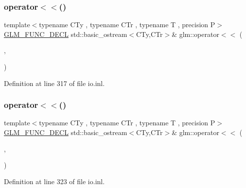 \subsubsection{\texorpdfstring{operator$<$$<$()}{operator<<()}\hspace{0.1cm}{\footnotesize\ttfamily [6/15]}}
{\footnotesize\ttfamily template$<$typename C\+Ty , typename C\+Tr , typename T , precision P$>$ \\
\mbox{\hyperlink{setup_8hpp_ab2d052de21a70539923e9bcbf6e83a51}{G\+L\+M\+\_\+\+F\+U\+N\+C\+\_\+\+D\+E\+CL}} std\+::basic\+\_\+ostream$<$C\+Ty,C\+Tr$>$\& glm\+::operator$<$$<$ (\begin{DoxyParamCaption}\item[{std\+::basic\+\_\+ostream$<$ C\+Ty, C\+Tr $>$ \&}]{,  }\item[{\mbox{\hyperlink{structglm_1_1tmat2x2}{tmat2x2}}$<$ T, P $>$ const \&}]{ }\end{DoxyParamCaption})}



Definition at line 317 of file io.\+inl.

\mbox{\label{group__gtx__io_ga032043616f87c7eefaf4d83a20f779a5}} 
\subsubsection{\texorpdfstring{operator$<$$<$()}{operator<<()}\hspace{0.1cm}{\footnotesize\ttfamily [7/15]}}
{\footnotesize\ttfamily template$<$typename C\+Ty , typename C\+Tr , typename T , precision P$>$ \\
\mbox{\hyperlink{setup_8hpp_ab2d052de21a70539923e9bcbf6e83a51}{G\+L\+M\+\_\+\+F\+U\+N\+C\+\_\+\+D\+E\+CL}} std\+::basic\+\_\+ostream$<$C\+Ty,C\+Tr$>$\& glm\+::operator$<$$<$ (\begin{DoxyParamCaption}\item[{std\+::basic\+\_\+ostream$<$ C\+Ty, C\+Tr $>$ \&}]{,  }\item[{\mbox{\hyperlink{structglm_1_1tmat2x3}{tmat2x3}}$<$ T, P $>$ const \&}]{ }\end{DoxyParamCaption})}



Definition at line 323 of file io.\+inl.

\mbox{\label{group__gtx__io_ga1a2314cab31da0e736bc5e601bcb8f37}} 
